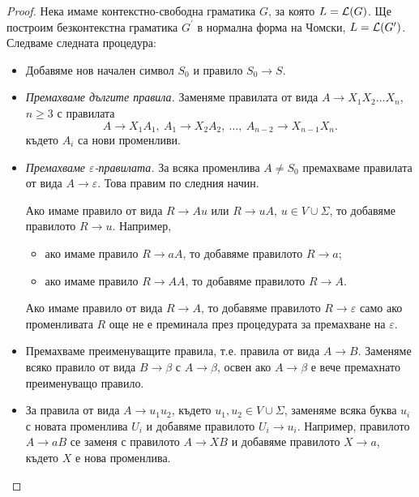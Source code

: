 \begin{proof}
  Нека имаме контекстно-свободна граматика $G$, за която $L = \mathcal{L}(G)$.
  Ще построим безконтекстна граматика $G^\prime$ в нормална форма на Чомски, $L = \mathcal{L}(G^\prime)$.
  Следваме следната процедура:
  \begin{itemize}
  \item
    Добавяме нов начален символ $S_0$ и правило $S_0 \to S$.
  \item
    {\em Премахваме дългите правила.}
    Заменяме правилата от вида $A\to X_1X_2\dots X_n$, $n\geq 3$ с
    правилата \[A\to X_1A_1,\ A_1\to X_2A_2,\ \dots,\ A_{n-2} \to X_{n-1}X_n.\]
    където $A_i$ са нови променливи.
  \item
    {\em Премахваме $\varepsilon$-правилата.}
    За всяка променлива $A \neq S_0$ премахваме правилата от вида $A\to\varepsilon$.
    Това правим по следния начин.
    
    Ако имаме правило от вида $R \to Au$ или $R\to u A$, $u \in V \cup \Sigma$,
    то добавяме правилото $R\to u$.
    Например, 
    \begin{itemize}
    \item 
      ако имаме правило $R\to aA$, то добавяме правилото $R \to a$;
    \item
      ако имаме правило $R\to AA$, то добавяме правилото $R \to A$.
    \end{itemize}
    Ако имаме правило от вида $R\to A$, то добавяме правилото $R\to\varepsilon$
    само ако променливата $R$ още не е преминала през процедурата за премахване на $\varepsilon$.
  \item
    Премахваме преименуващите правила, т.е. правила от вида $A\to B$.
    Заменяме всяко правило от вида $B \to \beta$ с $A\to \beta$,
    освен ако $A \to \beta$ е вече премахнато преименуващо правило.
  \item
    За правила от вида $A\to u_1 u_2$, където $u_1, u_2 \in V \cup \Sigma$, 
    заменяме всяка буква $u_i$ с новата променлива $U_i$
    и добавяме правилото $U_i\to u_i$.
    Например, правилото $A \to aB$ се заменя с правилото $A \to XB$ и добавяме правилото $X \to a$,
    където $X$ е нова променлива.
  \end{itemize}
\end{proof}

